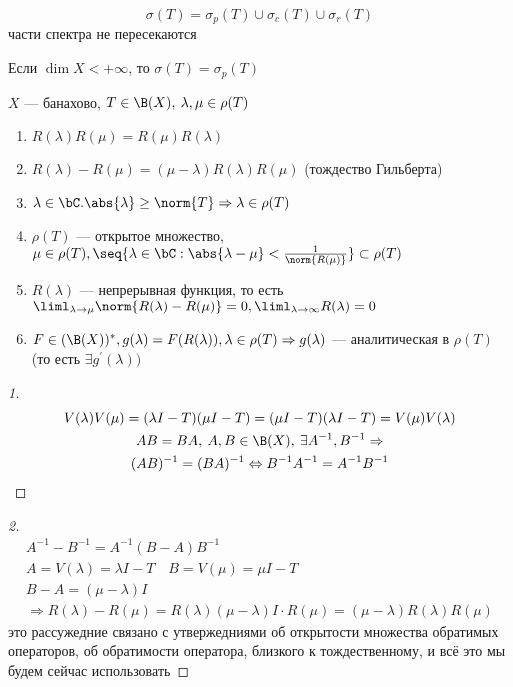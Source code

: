\documentclass[document]{subfiles}
\begin{document}
\[ \sigma(T) = \sigma_p(T) \cup \sigma_c(T) \cup \sigma_r(T) \] 
части спектра не пересекаются

\begin{example}
    Если $\dim X < +\infty$, то $\sigma(T) = \sigma_p(T)$
\end{example}

\begin{theorem}
    $X$ --- банахово, $T \in \B(X), \: \lambda, \mu \in \rho(T)$
    \begin{enumerate}
        \item $R(\lambda) R(\mu) = R(\mu) R(\lambda)$
        \item $R(\lambda)-R(\mu)=(\mu-\lambda)R(\lambda)R(\mu)$ (тождество Гильберта) 
        \item $\lambda \in \bC. \abs{\lambda} \geq \norm{T} \Rightarrow \lambda \in \rho(T)$
        \item $\rho(T)$ --- открытое множество, $\mu \in \rho(T), \seq{\lambda \in \bC: \abs{\lambda - \mu} < \frac{1}{\norm{R(\mu)}}} \subset \rho(T)$
        \item $R(\lambda)$ --- непрерывная функция, то есть $\liml_{\lambda \to \mu} \norm{R(\lambda) - R(\mu)} = 0, \liml_{\lambda \to \infty} R(\lambda) = 0$
        \item $F \in (\B(X))^*, g(\lambda) = F(R(\lambda)), \lambda \in \rho(T) \Rightarrow g(\lambda)$ --- аналитическая в $\rho(T)$ (то есть $\exists g^\prime(\lambda))$
    \end{enumerate}
\end{theorem}

\begin{proof}[1]
    \begin{gather*}
        V(\lambda)V(\mu) = (\lambda I - T)(\mu I - T) = (\mu I - T)(\lambda I - T) = V(\mu)V(\lambda) \\
        AB = BA, \: A,B \in \B(X), \: \exists A^{-1}, B^{-1} \Rightarrow \\
        (AB)^{-1} = (BA)^{-1} \Leftrightarrow B^{-1}A^{-1} = A^{-1}B^{-1}
    \end{gather*}
\end{proof}

\begin{proof}[2]
    \begin{gather*}
        A^{-1} - B^{-1} = A^{-1}(B-A)B^{-1} \\
        A = V(\lambda) = \lambda I - T \quad B = V(\mu) = \mu I - T \\
        B - A = (\mu - \lambda) I \\
        \Rightarrow R(\lambda) - R(\mu) = R(\lambda)(\mu - \lambda)I \cdot R(\mu) = (\mu - \lambda)R(\lambda)R(\mu)
    \end{gather*}
    это рассужедние связано с утвержедниями об открытости множества обратимых операторов, об обратимости оператора, близкого к тождественному,
     и всё это мы будем сейчас использовать
\end{proof}
\end{document}
